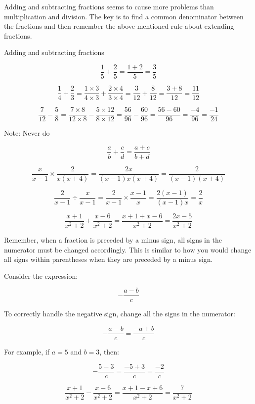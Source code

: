 Adding and subtracting fractions seems to cause more problems than multiplication and division. The key is to find a common denominator between the fractions and then remember the above-mentioned rule about extending fractions.

\begin{example} Adding and subtracting fractions

 \[
\frac{1}{5} + \frac{2}{5} = \frac{1 + 2}{5} = \frac{3}{5}
\]

\[
\frac{1}{4} + \frac{2}{3} = \frac{1 \times 3}{4 \times 3} + \frac{2 \times 4}{3 \times 4} = \frac{3}{12} + \frac{8}{12} = \frac{3 + 8}{12} = \frac{11}{12}
\]

\[
\frac{7}{12} - \frac{5}{8} = \frac{7 \times 8}{12 \times 8} - \frac{5 \times 12}{8 \times 12} = \frac{56}{96} - \frac{60}{96} = \frac{56 - 60}{96} = \frac{-4}{96} = \frac{-1}{24}
\]

\end{example}

Note: Never do

\[
\frac{a}{b} + \frac{c}{d} = \frac{a + c}{b + d}
\]   

\begin{example}

\[
\frac{x}{x - 1} \times \frac{2}{x(x + 4)} = \frac{2x}{(x - 1)x(x + 4)} = \frac{2}{(x - 1)(x + 4)}
\]

\[
\frac{2}{x - 1} \div \frac{x}{x - 1} = \frac{2}{x - 1} \times \frac{x - 1}{x} = \frac{2(x - 1)}{(x - 1)x} = \frac{2}{x}
\]

\[
\frac{x + 1}{x^2 + 2} + \frac{x - 6}{x^2 + 2} = \frac{x + 1 + x - 6}{x^2 + 2} = \frac{2x - 5}{x^2 + 2}
\]    
\end{example}

Remember, when a fraction is preceded by a minus sign, all signs in the numerator must be changed accordingly. This is similar to how you would change all signs within parentheses when they are preceded by a minus sign.

Consider the expression:

\[
-\frac{a - b}{c}
\]

To correctly handle the negative sign, change all the signs in the numerator:

\[
-\frac{a - b}{c} = \frac{-a + b}{c}
\]

For example, if \(a = 5\) and \(b = 3\), then:

\[
-\frac{5 - 3}{c} = \frac{-5 + 3}{c} = \frac{-2}{c}
\]

\begin{example}

\[
\frac{x + 1}{x^2 + 2} - \frac{x - 6}{x^2 + 2} = \frac{x + 1 - x + 6}{x^2 + 2} = \frac{7}{x^2 + 2}
\]    
\end{example}


